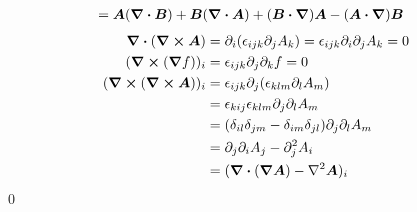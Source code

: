 \documentclass[uplatex,dvipdfmx,a4paper,11pt]{jlreq}
\makeatletter
\newcommand{\rot}{\curl}
\theoremstyle{definition}
\renewenvironment{proof}[1][\proofname]{\par
  \normalfont
  \topsep6\p@\@plus6\p@ \trivlist
  \item[\hskip\labelsep{\bfseries #1}\@addpunct{\bfseries}]\ignorespaces\quad\par
}{%
  \qed\endtrivlist\@endpefalse
}
\renewcommand\proofname{証明}
\makeatother
\begin{document}
\begin{proof}
\begin{align}
                                   & = \bm{A}(\div{\bm{B}}) + \bm{B}(\div{\bm{A}}) + (\bm{B}\vdot\vnabla)\bm{A} - (\bm{A}\vdot\vnabla)\bm{B}
  \end{align}
  \begin{align}
    \div{(\rot{\bm{A}})}     & = \partial_i(\epsilon_{ijk}\partial_jA_k) = \epsilon_{ijk}\partial_i\partial_jA_k = 0 \\
    (\rot{(\grad{f})})_i     & = \epsilon_{ijk}\partial_j\partial_kf = 0                                             \\
    (\rot{(\rot{\bm{A}})})_i & = \epsilon_{ijk}\partial_j(\epsilon_{klm}\partial_lA_m)                               \\
                             & = \epsilon_{kij}\epsilon_{klm}\partial_j\partial_lA_m                                 \\
                             & = (\delta_{il}\delta_{jm} - \delta_{im}\delta_{jl})\partial_j\partial_lA_m            \\
                             & = \partial_j\partial_iA_j - \partial_j^2A_i                                           \\
                             & = (\div{(\grad{\bm{A}})} - \laplacian{\bm{A}})_i
  \end{align}
\end{proof}
\end{document}
